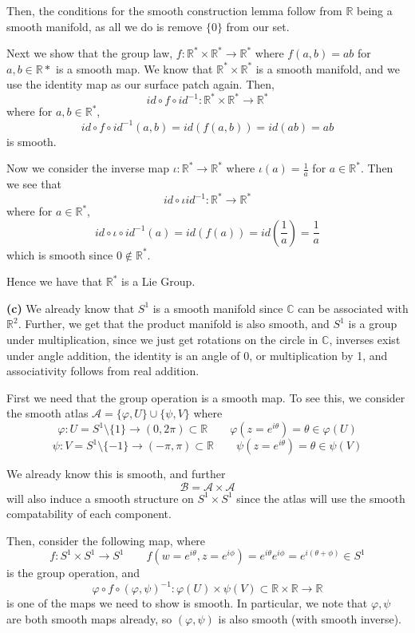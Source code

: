 \documentclass[10pt]{article}
\newcommand{\R}{\mathbb{R}}
\newcommand{\C}{\mathbb{C}}
\begin{document}
Then, the conditions for the smooth construction lemma follow from $\R$ being a smooth manifold, as all we do is remove $\{0\}$ from our set.

Next we show that the group law, $f: \R^{*}\times \R^{*} \to \R^{*}$ where $f(a,b) = ab$ for $a,b\in \R{*}$ is a smooth map. We know that $\R^{*}\times \R^{*}$ is a smooth manifold, and we use the identity map as our surface patch again. Then,
$$id \circ f \circ id^{-1}: \R^{*}\times\R^{*} \to \R^{*}$$
where for $a,b\in \R^{*}$,
$$id \circ f \circ id^{-1}(a,b) = id(f(a,b)) = id(ab) = ab$$
is smooth.

Now we consider the inverse map $\iota : \R^{*} \to \R^{*}$ where $\iota(a) = \frac{1}{a}$ for $a\in \R^{*}$. Then we see that
$$id \circ \iota id^{-1}: \R^{*} \to \R^{*}$$
where for $a \in \R^{*}$,
$$id \circ \iota \circ id^{-1}(a) = id(f(a)) = id\left(\frac{1}{a}\right) = \frac{1}{a}$$
which is smooth since $0 \notin \R^{*}$.

Hence we have that $\R^{*}$ is a Lie Group.

\textbf{(c)} We already know that $S^{1}$ is a smooth manifold since $\C$ can be associated with $\R^{2}$. Further, we get that the product manifold is also smooth, and $S^{1}$ is a group under multiplication, since we just get rotations on the circle in $\C$, inverses exist under angle addition, the identity is an angle of 0, or multiplication by 1, and associativity follows from real addition.

First we need that the group operation is a smooth map. To see this, we consider the smooth atlas $\mathcal{A} = \{\varphi,U\}\cup\{\psi,V\}$ where
$$\varphi: U = S^{1}\setminus \{1\} \to (0,2\pi)\subset \R  \hspace{2em} \varphi(z = e^{i\theta}) = \theta \in \varphi(U)$$
$$\psi: V = S^{1}\setminus \{-1\} \to (-\pi,\pi)\subset \R  \hspace{2em} \psi(z = e^{i\theta}) = \theta \in \psi(V)$$

We already know this is smooth, and further $$\mathcal{B} = \mathcal{A}\times \mathcal{A}$$ will also induce a smooth structure on $S^{1}\times S^{1}$ since the atlas will use the smooth compatability of each component.

Then, consider the following map, where
$$f: S^{1}\times S^{1} \to S^{1} \hspace{2em} f(w = e^{i\theta},z = e^{i\phi}) = e^{i\theta}e^{i\phi} = e^{i(\theta+\phi)}\in S^{1}$$
is the group operation, and
$$\varphi \circ f \circ (\varphi,\psi)^{-1}: \varphi(U)\times \psi(V) \subset \R\times\R \to \R$$
is one of the maps we need to show is smooth. In particular, we note that $\varphi,\psi$ are both smooth maps already, so $(\varphi,\psi)$ is also smooth (with smooth inverse).
\end{document}
